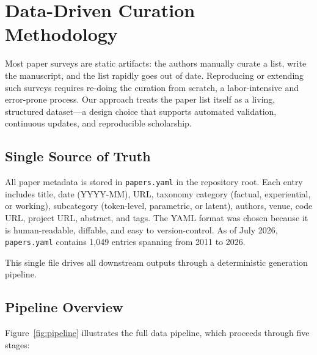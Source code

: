 \section{Data-Driven Curation Methodology}
\label{sec:methodology}

Most paper surveys are static artifacts: the authors manually curate a list, write the manuscript, and the list rapidly goes out of date. Reproducing or extending such surveys requires re-doing the curation from scratch, a labor-intensive and error-prone process. Our approach treats the paper list itself as a living, structured dataset---a design choice that supports automated validation, continuous updates, and reproducible scholarship.

\subsection{Single Source of Truth}

All paper metadata is stored in \texttt{papers.yaml} in the repository root. Each entry includes title, date (YYYY-MM), URL, taxonomy category (factual, experiential, or working), subcategory (token-level, parametric, or latent), authors, venue, code URL, project URL, abstract, and tags. The YAML format was chosen because it is human-readable, diffable, and easy to version-control. As of July 2026, \texttt{papers.yaml} contains 1,049 entries spanning from 2011 to 2026.

This single file drives all downstream outputs through a deterministic generation pipeline.

\subsection{Pipeline Overview}

Figure~\ref{fig:pipeline} illustrates the full data pipeline, which proceeds through five stages:

